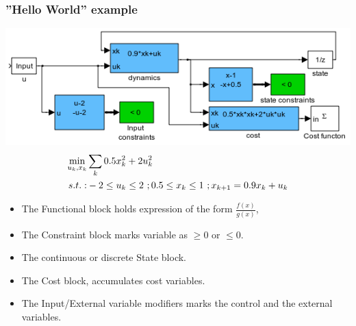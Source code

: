\documentclass[mathserif]{beamer}
\begin{document}
\begin{frame}
\frametitle{''Hello World'' example}

\centering 
\includegraphics[width = .7\textwidth]{HelloWorld}
\begin {align}
\min_{u_k,x_k}& \sum_k 0.5x_k^2 + 2u_k^2 \notag \\
s.t.:&  -2 \leq u_k \leq 2 \ ; 0.5 \leq x_k \leq 1\ ; x_{k+1}=0.9x_k+u_k \notag
\end{align}


\begin{itemize}
\item The \alert{Functional} block holds expression of the form $\frac{f(x)}{g(x)}$,
   
\item The \alert{Constraint} block marks variable as $\geq 0$ or $\leq 0$.  
\item The continuous or discrete \alert{State} block.
\item The \alert{Cost} block, accumulates cost variables.
\item The \alert{Input/External} variable modifiers marks the control and the
  external variables.
\end{itemize}
\end{frame}
\end{document}
